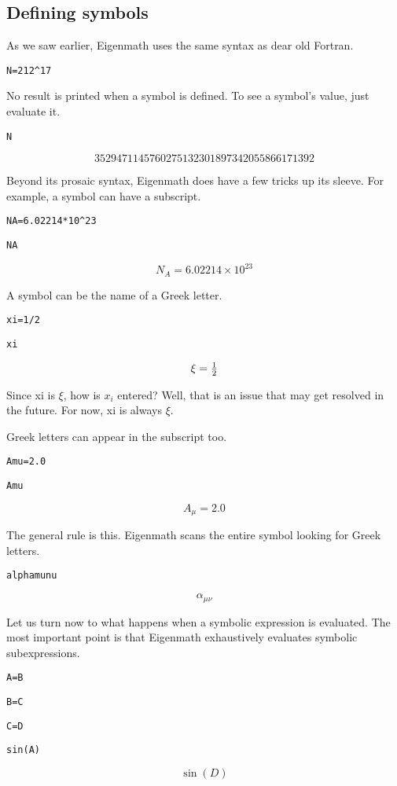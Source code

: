 
\subsection{Defining symbols}
As we saw earlier, Eigenmath uses the same syntax as dear old Fortran.

\medskip
\verb$N=212^17$

\medskip
\noindent
No result is printed when a symbol is defined.
To see a symbol's value, just evaluate it.

\medskip
\verb$N$

$$3529471145760275132301897342055866171392$$

\medskip
\noindent
Beyond its prosaic syntax, Eigenmath does have a few tricks up its sleeve.
For example, a symbol can have a subscript.

\medskip
\verb$NA=6.02214*10^23$

\verb$NA$

$$N_A=6.02214\times10^{23}$$

\medskip
\noindent
A symbol can be the name of a Greek letter.

\medskip
\verb$xi=1/2$

\verb$xi$

$$\xi=\hbox{$1\over2$}$$

\medskip
\noindent
Since xi is $\xi$, how is $x_i$ entered?
Well, that is an issue that may get resolved in the future.
For now, xi is always $\xi$.

\medskip
\noindent
Greek letters can appear in the subscript too.

\medskip
\verb$Amu=2.0$

\verb$Amu$

$$A_\mu=2.0$$

\medskip
\noindent
The general rule is this.
Eigenmath scans the entire symbol looking for Greek letters.

\medskip
\verb$alphamunu$

$$\alpha_{\mu\nu}$$

\newpage

\medskip
\noindent
Let us turn now to what happens when a symbolic expression is evaluated.
The most important point is that
Eigenmath exhaustively evaluates symbolic subexpressions.

\medskip
\verb$A=B$

\verb$B=C$

\verb$C=D$

\verb$sin(A)$

$$\sin(D)$$

